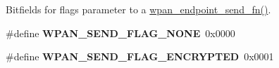 \label{_amgrp01747264fe7bf50731df0522c351974e}%
Bitfields for {\ttfamily flags} parameter to a \hyperlink{group__wpan__aps_ga66b2c3b27a4e56cd04ba2f70841e2646}{wpan\-\_\-endpoint\-\_\-send\-\_\-fn()}. \begin{DoxyCompactItemize}
\item 
\hypertarget{group__wpan__aps_ga527d35044842aa4e58eb3c4134eb968d}{\#define {\bfseries W\-P\-A\-N\-\_\-\-S\-E\-N\-D\-\_\-\-F\-L\-A\-G\-\_\-\-N\-O\-N\-E}~0x0000}\label{group__wpan__aps_ga527d35044842aa4e58eb3c4134eb968d}

\item 
\hypertarget{group__wpan__aps_ga5b0b8ed1c327d9da8beb9dec38d3117a}{\#define {\bfseries W\-P\-A\-N\-\_\-\-S\-E\-N\-D\-\_\-\-F\-L\-A\-G\-\_\-\-E\-N\-C\-R\-Y\-P\-T\-E\-D}~0x0001}\label{group__wpan__aps_ga5b0b8ed1c327d9da8beb9dec38d3117a}

\end{DoxyCompactItemize}
\label{_amgrp01747264fe7bf50731df0522c351974e}%
